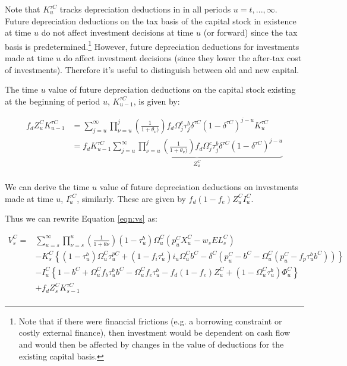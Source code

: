 \noindent\noindent Note that $K^{\tau C}_{u}$ tracks depreciation deductions in in all periods $u=t,...,\infty$.  Future depreciation deductions on the tax basis of the capital stock in existence at time $u$ do not affect investment decisions at time $u$ (or forward) since the tax basis is predetermined.\footnote{Note that if there were financial frictions (e.g. a borrowing constraint or costly external finance), then investment would be dependent on cash flow and would then be affected by changes in the value of deductions for the existing capital basis.}  However, future depreciation deductions for investments made at time $u$ do affect investment decisions (since they lower the after-tax cost of investments).  Therefore it's useful to distinguish between old and new capital. 

The time $u$ value of future depreciation deductions on the capital stock existing at the beginning of period $u$, $K^{\tau C}_{u-1}$, is given by: 

\begin{equation}
\label{eqn:z}
\begin{split}
f_{d}Z^{C}_{u}K^{\tau C}_{u-1} &=  \sum^{\infty}_{j=u} \prod_{\nu=u}^{j} \left(\frac{1}{1+\theta_{\nu})}\right)f_{d}\Omega^{c}_{j}\tau^{b}_{j}\delta^{\tau C}(1-\delta^{\tau C})^{j-u}K^{\tau C}_{u} \\
&= f_{d} K^{\tau C}_{u-1} \underbrace{\sum^{\infty}_{j=u} \prod_{\nu=u}^{j} \left(\frac{1}{1+\theta_{\nu})}\right)f_{d}\Omega^{c}_{j}\tau^{b}_{j}\delta^{\tau C}(1-\delta^{\tau C})^{j-u}}_{Z^{C}_{u}} \\
\end{split}
\end{equation}

We can derive the time $u$ value of future depreciation deductions on investments made at time $u$, $I^{\tau C}_{u}$, similarly.  These are given by $f_{d}(1-f_{e})Z^{C}_{u}I^{C}_{u}$.

Thus we can rewrite Equation \ref{eqn:vs} as: 

 \begin{equation}
\label{eqn:vs_w_z}
\begin{split}
V^{C}_{s} = &  \sum_{u=s}^{\infty} \prod_{\nu=s}^{u}\left(\frac{1}{1+\theta{\nu}}\right) (1-\tau^{b}_{u})\Omega^{C}_{u}(p^{C}_{u}X^{C}_{u}-w_{s}EL^{C}_{s})  \\ 
 & - K^{C}_{s} \left\{(1-\tau^{b}_{u})\Omega^{C}_{u}\tau^{pC}_{u}+(1-f_{i}\tau^{i}_{u})i_{u}\Omega^{C}_{u}b^{C}-\delta^{C}(p^{C}_{u}-b^{C}-\Omega^{C}_{u}(p^{C}_{u}-f_{p}\tau^{b}_{u}b^{C}))\right\}  \\
 & - I^{C}_{u}\left\{1-b^{C}+\Omega^{C}_{u}f_{b}\tau^{b}_{u}b^{C}-\Omega^{C}_{u}f_{e}\tau^{b}_{u} - f_{d}(1-f_{e})Z^{C}_{u} + (1-\Omega^{C}_{u}\tau^{b}_{u})\Phi^{C}_{u}\right\} \\
 &  + f_{d}Z^{C}_{s}K^{\tau C}_{s-1} \\
\end{split}
\end{equation}


